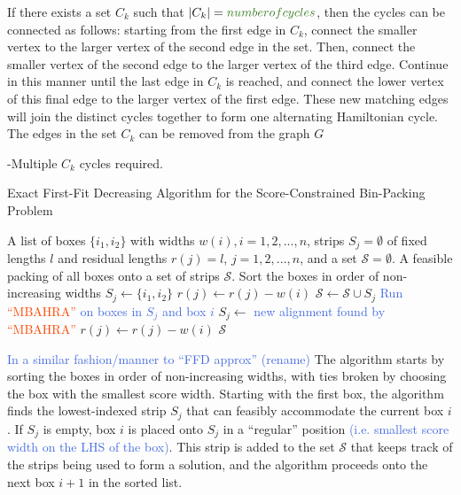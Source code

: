 \documentclass[oribibl]{llncs}
\begin{document}
If there exists a set $C_k$ such that $|C_k| = \textcolor{OliveGreen}{number of cycles}$, then the cycles can be connected as follows: starting from the first edge in $C_k$, connect the smaller vertex to the larger vertex of the second edge in the set. Then, connect the smaller vertex of the second edge to the larger vertex of the third edge. Continue in this manner until the last edge in $C_k$ is reached, and connect the lower vertex of this final edge to the larger vertex of the first edge. These new matching edges will join the distinct cycles together to form one alternating Hamiltonian cycle. The edges in the set $C_k$ can be removed from the graph $G$

-Multiple $C_k$ cycles required.
 













\begin{algorithm}[H]
	\caption{\textcolor{OliveGreen}{Exact First-Fit Decreasing Algorithm for the Score-Constrained Bin-Packing Problem}}
	\label{alg:ffdexact}
	\begin{algorithmic}[1]
	\Require A list of boxes $\{i_1, i_2\}$ with widths $w(i), i = 1, 2, ..., n$, strips $S_j = \emptyset$ of fixed lengths $l$ and residual lengths $r(j) = l$, $j = 1, 2, ...,n$, and a set $\mathcal{S} = \emptyset$.
	\Ensure A feasible packing of all boxes onto a set of strips $\mathcal{S}$.	
	\State Sort the boxes in order of non-increasing widths
				\State $S_j \gets \{i_1, i_2\}$
				\State $r(j) \gets r(j) - w(i)$
				\State $\mathcal{S} \gets \mathcal{S} \cup S_j$
				\Break
				\State \textcolor{RoyalBlue}{Run} \textcolor{OrangeRed}{``MBAHRA''} \textcolor{RoyalBlue}{on boxes in $S_j$ and box $i$}
					\State $S_j \gets$ \textcolor{RoyalBlue}{new alignment found by} \textcolor{OrangeRed}{``MBAHRA''}
					\State $r(j) \gets r(j) - w(i)$
					\Break
				\EndIf
			\EndIf
		\EndFor
	\EndFor
	\Return $\mathcal{S}$
	\end{algorithmic}	
\end{algorithm}

\textcolor{RoyalBlue}{In a similar fashion/manner to ``FFD approx'' (rename)} The algorithm starts by sorting the boxes in order of non-increasing widths, with ties broken by choosing the box with the smallest score width. Starting with the first box, the algorithm finds the lowest-indexed strip $S_j$ that can feasibly accommodate the current box $i$. If $S_j$ is empty, box $i$ is placed onto $S_j$ in a ``regular'' position \textcolor{RoyalBlue}{(i.e. smallest score width on the LHS of the box)}. This strip is added to the set $\mathcal{S}$ that keeps track of the strips being used to form a solution, and the algorithm proceeds onto the next box $i+1$ in the sorted list.
\end{document}

